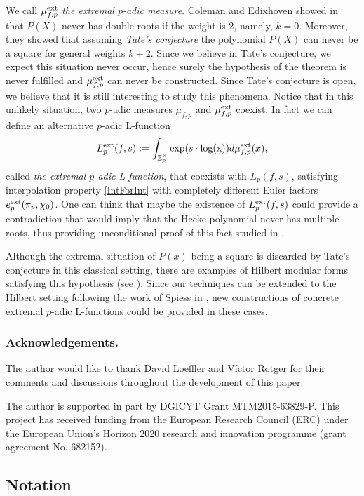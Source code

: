 \documentclass{amsart}
\newcommand{\Z}{{\mathbb Z}}
\begin{document}
We call $\mu_{f,p}^{\rm ext}$ \emph{the extremal $p$-adic measure}.
Coleman and Edixhoven showed in \cite{ColEd} that $P(X)$ never has double roots if the weight is 2, namely, $k = 0$. Moreover, they showed that assuming \emph{Tate's conjecture} the polynomial $P(X)$ can never be a square for general weights $k+2$. Since we believe in Tate's conjecture, we expect this situation never occur, hence surely the hypothesis of the theorem is never fulfilled and %
$\mu_{f,p}^{\rm ext}$ can never be constructed. Since Tate's conjecture is open, we believe that it is still interesting to study this phenomena. Notice that in this unlikely situation, two $p$-adic measures $\mu_{f,p}$ and $\mu_{f,p}^{\rm ext}$ coexist. In fact we can define an alternative $p$-adic L-function
\[
L_p^{\rm ext}(f,s):=\int_{\Z_p^\times}{\rm exp}(s\cdot{\rm log(x)})d\mu_{f,p}^{\rm ext}(x),
\]
called \emph{the extremal $p$-adic L-function}, that coexists with $L_p(f,s)$, satisfying interpolation property \eqref{IntForInt} with completely different Euler factors $e_p^{\rm ext}(\pi_p,\chi_0)$. One can think that maybe the existence of $L_p^{\rm ext}(f,s)$ could provide a contradiction that would imply that the Hecke polynomial never has multiple roots, thus providing unconditional proof of this fact studied in \cite{ColEd}.

Although the extremal situation of $P(x)$ being a square is discarded by Tate's conjecture in this classical setting, there are examples of Hilbert modular forms satisfying this hypothesis (see \cite[\S 3.3.1]{Chi15}). Since our techniques can be extended to the Hilbert setting following the work of Spiess in \cite{Spi14}, new constructions of concrete extremal $p$-adic L-functions could be provided in these cases. 


\subsubsection*{Acknowledgements.}
The author would like to thank David Loeffler and V\'ictor Rotger for their comments and discussions throughout the development of this paper.

The author is supported in part by DGICYT Grant MTM2015-63829-P.
This project has received funding from the European Research Council
(ERC) under the European Union's Horizon 2020 research and innovation
programme (grant agreement No. 682152).



\subsection{Notation}
\end{document}
